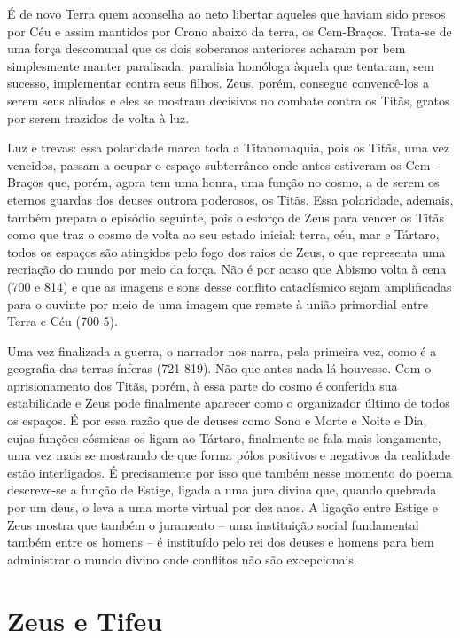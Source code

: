 É de novo Terra quem aconselha ao neto libertar aqueles que haviam sido
presos por Céu e assim mantidos por Crono abaixo da terra, os
Cem-Braços. Trata-se de uma força descomunal que os dois soberanos
anteriores acharam por bem simplesmente manter paralisada, paralisia
homóloga àquela que tentaram, sem sucesso, implementar contra seus
filhos. Zeus, porém, consegue convencê-los a serem seus aliados e eles
se mostram decisivos no combate contra os Titãs, gratos por serem
trazidos de volta à luz.

Luz e trevas: essa polaridade marca toda a Titanomaquia, pois os Titãs,
uma vez vencidos, passam a ocupar o espaço subterrâneo onde antes
estiveram os Cem-Braços que, porém, agora tem uma honra, uma função no
cosmo, a de serem os eternos guardas dos deuses outrora poderosos, os
Titãs. Essa polaridade, ademais, também prepara o episódio seguinte,
pois o esforço de Zeus para vencer os Titãs como que traz o cosmo de
volta ao seu estado inicial: terra, céu, mar e Tártaro, todos os espaços
são atingidos pelo fogo dos raios de Zeus, o que representa uma
recriação do mundo por meio da força. Não é por acaso que Abismo volta à
cena (700 e 814) e que as imagens e sons desse conflito cataclísmico
sejam amplificadas para o ouvinte por meio de uma imagem que remete à
união primordial entre Terra e Céu (700-5).

Uma vez finalizada a guerra, o narrador nos narra, pela primeira vez,
como é a geografia das terras ínferas (721-819). Não que antes nada lá
houvesse. Com o aprisionamento dos Titãs, porém, à essa parte do cosmo é
conferida sua estabilidade e Zeus pode finalmente aparecer como o
organizador último de todos os espaços. É por essa razão que de deuses
como Sono e Morte e Noite e Dia, cujas funções cósmicas os ligam ao
Tártaro, finalmente se fala mais longamente, uma vez mais se mostrando
de que forma pólos positivos e negativos da realidade estão
interligados. É precisamente por isso que também nesse momento do poema
descreve-se a função de Estige, ligada a uma jura divina que, quando
quebrada por um deus, o leva a uma morte virtual por dez anos. A ligação
entre Estige e Zeus mostra que também o juramento -- uma instituição
social fundamental também entre os homens -- é instituído pelo rei dos
deuses e homens para bem administrar o mundo divino onde conflitos não
são excepcionais.

\section{Zeus e Tifeu}

